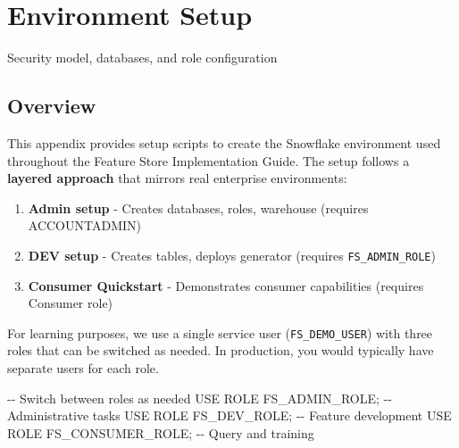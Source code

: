 \documentclass[
  letterpaper,
  DIV=11,
  numbers=noendperiod]{scrreprt}
\newenvironment{Shaded}{\begin{snugshade}}{\end{snugshade}}
\newcommand{\CommentTok}[1]{\textcolor[rgb]{0.37,0.37,0.37}{#1}}
\newcommand{\KeywordTok}[1]{\textcolor[rgb]{0.00,0.23,0.31}{#1}}
\newcommand{\NormalTok}[1]{\textcolor[rgb]{0.00,0.23,0.31}{#1}}
\providecommand{\tightlist}{%
  \setlength{\itemsep}{0pt}\setlength{\parskip}{0pt}}\usepackage{longtable,booktabs,array}
\begin{document}
\hypertarget{environment-setup-1}{%
\chapter{Environment Setup}\label{environment-setup-1}}

Security model, databases, and role configuration

\hfill\break

\hypertarget{overview-17}{%
\section{Overview}\label{overview-17}}

This appendix provides setup scripts to create the Snowflake environment
used throughout the Feature Store Implementation Guide. The setup
follows a \textbf{layered approach} that mirrors real enterprise
environments:

\begin{enumerate}
\def\labelenumi{\arabic{enumi}.}
\tightlist
\item
  \textbf{Admin setup} - Creates databases, roles, warehouse (requires
  ACCOUNTADMIN)
\item
  \textbf{DEV setup} - Creates tables, deploys generator (requires
  \texttt{FS\_ADMIN\_ROLE})
\item
  \textbf{Consumer Quickstart} - Demonstrates consumer capabilities
  (requires Consumer role)
\end{enumerate}

\begin{tcolorbox}[enhanced jigsaw, title=\textcolor{quarto-callout-tip-color}{\faLightbulb}\hspace{0.5em}{Single User, Multiple Roles}, colbacktitle=quarto-callout-tip-color!10!white, rightrule=.15mm, arc=.35mm, colframe=quarto-callout-tip-color-frame, left=2mm, bottomtitle=1mm, toptitle=1mm, breakable, bottomrule=.15mm, opacityback=0, titlerule=0mm, toprule=.15mm, opacitybacktitle=0.6, colback=white, coltitle=black, leftrule=.75mm]

For learning purposes, we use a single service user
(\texttt{FS\_DEMO\_USER}) with three roles that can be switched as
needed. In production, you would typically have separate users for each
role.

\begin{Shaded}
\begin{Highlighting}[]
\CommentTok{{-}{-} Switch between roles as needed}
\KeywordTok{USE} \KeywordTok{ROLE}\NormalTok{ FS\_ADMIN\_ROLE;      }\CommentTok{{-}{-} Administrative tasks}
\KeywordTok{USE} \KeywordTok{ROLE}\NormalTok{ FS\_DEV\_ROLE;      }\CommentTok{{-}{-} Feature development  }
\KeywordTok{USE} \KeywordTok{ROLE}\NormalTok{ FS\_CONSUMER\_ROLE; }\CommentTok{{-}{-} Query and training}
\end{Highlighting}
\end{Shaded}

\end{tcolorbox}
\end{document}
